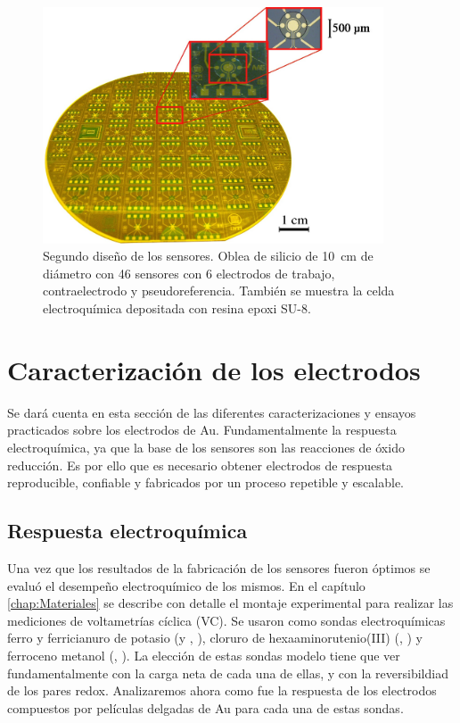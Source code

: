 {					  %
					  \begin{figure}[h!]
					  \begin{center}
					  \includegraphics[width=0.90\textwidth]{Imagenes/ObleaV2.jpg}
					  \caption[Electrodos, segunda versión]{Segundo diseño de los sensores. Oblea de silicio de \SI{10}{cm} de diámetro con 46 sensores con 6 electrodos de trabajo, contraelectrodo y pseudoreferencia. También se muestra la celda electroquímica depositada con resina epoxi SU-8.}
					  \label{fig:ObleaV2}
					  \end{center}
					  \end{figure} 	
	
		\section{Caracterización de los electrodos}

		 Se dará cuenta en esta sección de las diferentes caracterizaciones y ensayos practicados sobre los electrodos de Au. Fundamentalmente la respuesta electroquímica, ya que la base de los sensores son las reacciones de óxido reducción. Es por ello que es necesario obtener electrodos de respuesta reproducible, confiable y fabricados por un proceso repetible y escalable. 

	\subsection{Respuesta electroquímica}\label{sec:respuesta_sondas_au}
			 		
			Una vez que los resultados de la fabricación de los sensores fueron óptimos se evaluó el desempeño electroquímico de los mismos. En el capítulo \ref{chap:Materiales} se describe con detalle el montaje experimental para realizar las mediciones de voltametrías cíclica (VC). Se usaron como sondas electroquímicas ferro y ferricianuro de potasio (\Ferro\space y \Ferri, \fe), cloruro de hexaaminorutenio(III) (\aminorutenioCompleto, \ru) y ferroceno metanol (\ferroceno, \fc). La elección de estas sondas modelo tiene que ver fundamentalmente con la carga neta de cada una de ellas, y con la reversibildiad de los pares redox. Analizaremos ahora como fue la respuesta de los electrodos compuestos por películas delgadas de Au para cada una de estas sondas.
				
}
